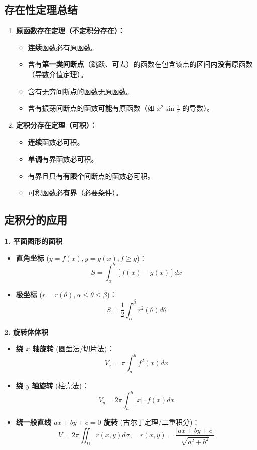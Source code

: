 \documentclass[a4paper,12pt]{ctexart}
\begin{document}
\subsection{存在性定理总结}
\begin{enumerate}
    \item \textbf{原函数存在定理（不定积分存在）：}
    \begin{itemize}
        \item \textbf{连续}函数必有原函数。
        \item 含有\textbf{第一类间断点}（跳跃、可去）的函数在包含该点的区间内\textbf{没有}原函数（导数介值定理）。
        \item 含有无穷间断点的函数无原函数。
        \item 含有振荡间断点的函数\textbf{可能}有原函数（如 $x^2 \sin \frac{1}{x}$ 的导数）。
    \end{itemize}
    \item \textbf{定积分存在定理（可积）：}
    \begin{itemize}
        \item \textbf{连续}函数必可积。
        \item \textbf{单调}有界函数必可积。
        \item 有界且只有\textbf{有限个}间断点的函数必可积。
        \item 可积函数必\textbf{有界}（必要条件）。
    \end{itemize}
\end{enumerate}

\subsection{定积分的应用}

\textbf{1. 平面图形的面积}
\begin{itemize}
    \item \textbf{直角坐标} ($y=f(x), y=g(x), f \ge g$)：
    \[ S = \int_a^b [f(x) - g(x)] dx \]
    \item \textbf{极坐标} ($r = r(\theta), \alpha \le \theta \le \beta$)：
    \[ S = \frac{1}{2} \int_\alpha^\beta r^2(\theta) d\theta \]
\end{itemize}

\textbf{2. 旋转体体积}
\begin{itemize}
    \item \textbf{绕 $x$ 轴旋转} (圆盘法/切片法)：
    \[ V_x = \pi \int_a^b f^2(x) dx \]
    \item \textbf{绕 $y$ 轴旋转} (柱壳法)：
    \[ V_y = 2\pi \int_a^b |x| \cdot f(x) dx \]
    \item \textbf{绕一般直线 $ax+by+c=0$ 旋转} (古尔丁定理/二重积分)：
    \[ V = 2\pi \iint_D r(x,y) d\sigma, \quad r(x,y) = \frac{|ax+by+c|}{\sqrt{a^2+b^2}} \]
\end{itemize}
\end{document}
